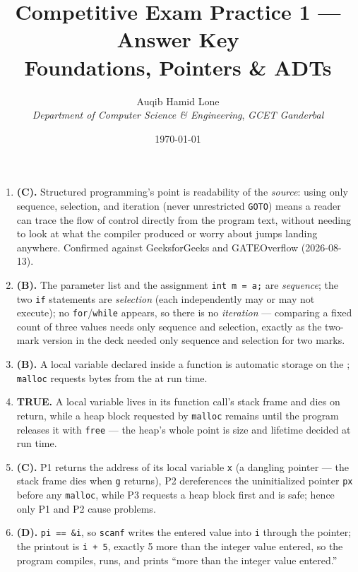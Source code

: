 \documentclass[11pt]{article}
\title{Competitive Exam Practice 1 --- Answer Key\\\large Foundations, Pointers \& ADTs}
\author{Auqib Hamid Lone\\[0.3em]
  \emph{Department of Computer Science \& Engineering}, \emph{GCET Ganderbal}}
\date{\today}
\begin{document}
\maketitle

\begin{enumerate}
\item[\textbf{Q1}] \textbf{(C).} Structured programming's point is readability of the \emph{source}: using only sequence, selection, and iteration (never unrestricted \texttt{GOTO}) means a reader can trace the flow of control directly from the program text, without needing to look at what the compiler produced or worry about jumps landing anywhere. Confirmed against GeeksforGeeks and GATEOverflow (2026-08-13).

\item[\textbf{Q2}] \textbf{(B).} The parameter list and the assignment \texttt{int m = a;} are \emph{sequence}; the two \texttt{if} statements are \emph{selection} (each independently may or may not execute); no \texttt{for}/\texttt{while} appears, so there is no \emph{iteration} --- comparing a fixed count of three values needs only sequence and selection, exactly as the two-mark version in the deck needed only sequence and selection for two marks.

\item[\textbf{Q3}] \textbf{(B).} A local variable declared inside a function is automatic storage on the ; \texttt{malloc} requests bytes from the  at run time.

\item[\textbf{Q4}] \textbf{TRUE.} A local variable lives in its function call's stack frame and dies on return, while a heap block requested by \texttt{malloc} remains until the program releases it with \texttt{free} --- the heap's whole point is size and lifetime decided at run time.

\item[\textbf{Q5}] \textbf{(C).} P1 returns the address of its local variable \texttt{x} (a dangling pointer --- the stack frame dies when \texttt{g} returns), P2 dereferences the uninitialized pointer \texttt{px} before any \texttt{malloc}, while P3 requests a heap block first and is safe; hence only P1 and P2 cause problems.

\item[\textbf{Q6}] \textbf{(D).} \texttt{pi == \&i}, so \texttt{scanf} writes the entered value into \texttt{i} through the pointer; the printout is \texttt{i + 5}, exactly 5 more than the integer value entered, so the program compiles, runs, and prints ``more than the integer value entered.''


\end{enumerate}
\end{document}
